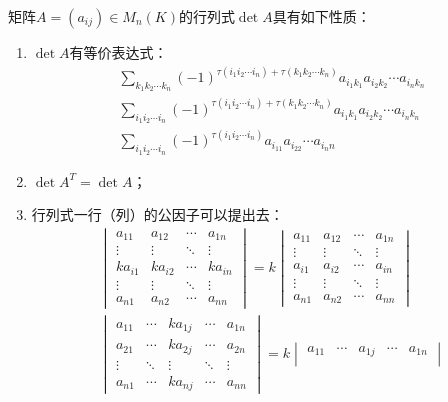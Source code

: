 \begin{property}\label{prop:Determinant}
	矩阵$A=(a_{ij})\in M_{n}(K)$的行列式$\det A$具有如下性质：
	\begin{enumerate}
		\item $\det A$有等价表达式：
		\begin{gather*}
			\sum_{k_1k_2\cdots k_n}^{}(-1)^{\tau(i_1i_2\cdots i_n)+\tau(k_1k_2\cdots k_n)}a_{i_1k_1}a_{i_2k_2}\cdots a_{i_nk_n} \\
			\sum_{i_1i_2\cdots i_n}^{}(-1)^{\tau(i_1i_2\cdots i_n)+\tau(k_1k_2\cdots k_n)}a_{i_1k_1}a_{i_2k_2}\cdots a_{i_nk_n} \\
			\sum_{i_1i_2\cdots i_n}^{}(-1)^{\tau(i_1i_2\cdots i_n)}a_{i_11}a_{i_22}\cdots a_{i_nn}
		\end{gather*}
		\item $\det A^T=\det A$；
		\item 行列式一行（列）的公因子可以提出去：
		\begin{gather*}
			\begin{vmatrix}
				a_{11} & a_{12} & \cdots & a_{1n} \\
				\vdots & \vdots & \ddots & \vdots \\
				ka_{i1} & ka_{i2} & \cdots & ka_{in} \\
				\vdots & \vdots & \ddots & \vdots \\
				a_{n1} & a_{n2} & \cdots & a_{nn}
			\end{vmatrix}=k
			\begin{vmatrix}
				a_{11} & a_{12} & \cdots & a_{1n} \\
				\vdots & \vdots & \ddots & \vdots \\
				a_{i1} & a_{i2} & \cdots & a_{in} \\
				\vdots & \vdots & \ddots & \vdots \\
				a_{n1} & a_{n2} & \cdots & a_{nn}
			\end{vmatrix} \\
			\begin{vmatrix}
				a_{11} & \cdots & ka_{1j} & \cdots & a_{1n} \\
				a_{21} & \cdots & ka_{2j} & \cdots & a_{2n} \\
				\vdots & \ddots & \vdots & \ddots & \vdots \\
				a_{n1} & \cdots & ka_{nj} & \cdots & a_{nn}
			\end{vmatrix}=k
			\begin{vmatrix}
				a_{11} & \cdots & a_{1j} & \cdots & a_{1n} \\

\end{vmatrix}
\end{gather*}
\end{enumerate}
\end{property}
